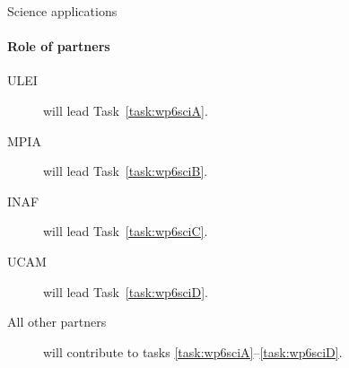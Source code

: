 \begin{workpackage}{Science applications}
\begin{wpdescription}
    \paragraph{Role of partners}
    \begin{description}
      \item[ULEI] will lead Task~\ref{task:wp6sciA}.
      \item[MPIA] will lead Task~\ref{task:wp6sciB}.
      \item[INAF] will lead Task~\ref{task:wp6sciC}.
      \item[UCAM] will lead Task~\ref{task:wp6sciD}.
      \item[All other partners] will contribute to tasks \ref{task:wp6sciA}--\ref{task:wp6sciD}.
    \end{description}
  \end{wpdescription}

  \begin{wpdeliverables}
  \end{wpdeliverables}

\end{workpackage}


